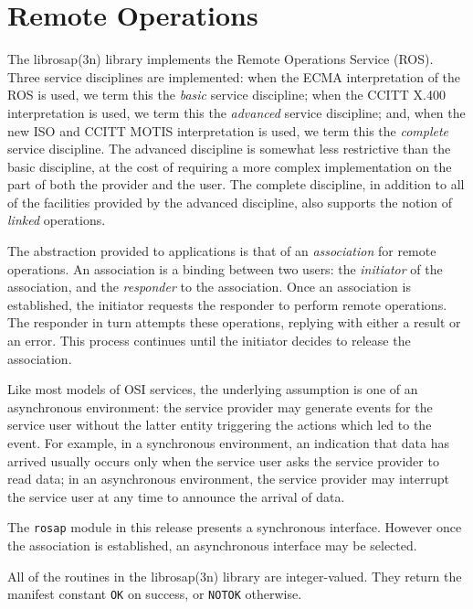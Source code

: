 
\chapter       {Remote Operations}\label{librosap}
The \man librosap(3n) library implements the Remote Operations Service (ROS).
Three service disciplines are implemented:
when the ECMA interpretation of the ROS is used,
we term this the {\em basic\/} service discipline;
when the CCITT X.400 interpretation is used,
we term this the {\em advanced\/} service discipline;
and,
when the new ISO and CCITT MOTIS interpretation is used,
we term this the {\em complete\/} service discipline.
The advanced discipline is somewhat less restrictive than the basic
discipline,
at the cost of requiring a more complex implementation on the part of both
the provider and the user.
The complete discipline, in addition to all of the facilities provided by the
advanced discipline, also supports the notion of {\em linked\/} operations.

The abstraction provided to applications is that of an {\em association\/}
for remote operations.
An association is a binding between two users:
the {\em initiator\/} of the association,
and the {\em responder\/} to the association.
Once an association is established,
the initiator requests the responder to perform remote operations.
The responder in turn attempts these operations,
replying with either a result or an error.
This process continues until the initiator decides to release the association.

Like most models of OSI services,
the underlying assumption is one of an asynchronous environment:
the service provider may generate events for the service user without the
latter entity triggering the actions which led to the event.
For example,
in a synchronous environment,
an indication that data has arrived usually occurs only when the service user
asks the service provider to read data;
in an asynchronous environment,
the service provider may interrupt the service user at any time to announce
the arrival of data.

The \verb"rosap" module in this release presents a synchronous interface.
However once the association is established,
an asynchronous interface may be selected.

All of the routines in the \man librosap(3n) library are integer-valued.
They return the manifest constant \verb"OK" on success,
or \verb"NOTOK" otherwise.

